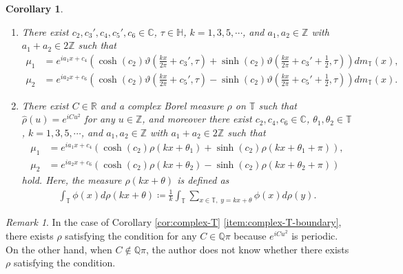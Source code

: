 \documentclass[12pt]{article}
\newtheorem{corollary}[theorem]{Corollary}
\theoremstyle{definition}
\theoremstyle{remark}
\newtheorem{remark}[theorem]{Remark}
\numberwithin{equation}{section}
\numberwithin{figure}{section}
\numberwithin{table}{section}
\begin{document}
\begin{corollary}
\begin{enumerate}
\item \label{item:complex-T-Gauss}

There exist $ c_2 , c_3', c_4 , c_5', c_6 \in \mathbb{ C } $, $ \tau \in \mathbb{ H } $, $ k = 1 , 3 , 5 , \cdots $, and $ a_1 , a_2 \in \mathbb{ Z } $ with $ a_1 + a_2 \in 2 \mathbb{ Z } $ such that
\begin{align}
\mu_1 & = e^{ i a_1 x + c_4 } \left( \cosh ( c_2 ) \vartheta \left( \frac{ k x }{ 2 \pi } + c_3' , \tau \right) + \sinh ( c_2 ) \vartheta \left( \frac{ k x }{ 2 \pi } + c_3' + \frac{ 1 }{ 2 } , \tau \right) \right) dm_{ \mathbb{ T } } ( x ), \\
\mu_2 & = e^{ i a_2 x + c_6 } \left( \cosh ( c_2 ) \vartheta \left( \frac{ k x }{ 2 \pi } + c_5' , \tau \right) - \sinh ( c_2 ) \vartheta \left( \frac{ k x }{ 2 \pi } + c_5' + \frac{ 1 }{ 2 } , \tau \right) \right) dm_{ \mathbb{ T } } ( x ).
\end{align}

\item \label{item:complex-T-boundary}

There exist $ C \in \mathbb{ R } $ and a complex Borel measure $ \rho $ on $ \mathbb{ T } $ such that $ \hat{ \rho } ( u ) = e^{ i C u^2 } $ for any $ u \in \mathbb{ Z } $, and moreover there exist $ c_2 , c_4 , c_6 \in \mathbb{ C } $, $ \theta_1 , \theta_2 \in \mathbb{ T } $, $ k = 1 , 3 , 5 , \cdots $, and $ a_1 , a_2 \in \mathbb{ Z } $ with $ a_1 + a_2 \in 2 \mathbb{ Z } $ such that
\begin{align}
\mu_1 & = e^{ i a_1 x + c_4 } \left( \cosh ( c_2 ) \rho ( k x + \theta_1 ) + \sinh ( c_2 ) \rho ( k x + \theta_1 + \pi ) \right), \\
\mu_2 & = e^{ i a_2 x + c_6 } \left( \cosh ( c_2 ) \rho ( k x + \theta_2 ) - \sinh ( c_2 ) \rho ( k x + \theta_2 + \pi ) \right)
\end{align}
hold.
Here, the measure $ \rho ( k x + \theta ) $ is defined as
\begin{align}
    \int_{ \mathbb{ T } } \phi ( x ) d \rho ( k x + \theta )
    \coloneqq \frac{ 1 }{ k } \int_{ \mathbb{ T } } \sum_{ x \in \mathbb{ T }, \; y = k x + \theta } \phi ( x ) d \rho ( y ). \label{eq:complex-T-boundary-scaling}
\end{align}

\end{enumerate}

\end{corollary}

\begin{remark}

In the case of Corollary \ref{cor:complex-T} \ref{item:complex-T-boundary}, there exists $ \rho $ satisfying the condition for any $ C \in \mathbb{ Q } \pi $ because $ e^{ i C u^2 } $ is periodic.
On the other hand, when $ C \notin \mathbb{ Q } \pi $, the author does not know whether there exists $ \rho $ satisfying the condition.

\end{remark}
\end{document}
